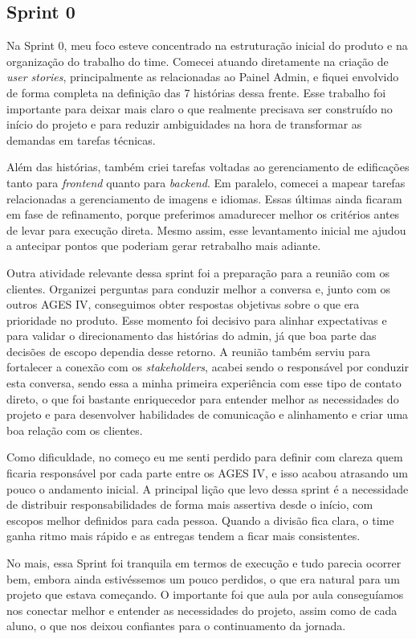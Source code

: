 \subsection{Sprint 0}

Na Sprint 0, meu foco esteve concentrado na estruturação inicial do produto e na organização do trabalho do time. Comecei atuando diretamente na criação de \textit{user stories}, principalmente as relacionadas ao Painel Admin, e fiquei envolvido de forma completa na definição das 7 histórias dessa frente. Esse trabalho foi importante para deixar mais claro o que realmente precisava ser construído no início do projeto e para reduzir ambiguidades na hora de transformar as demandas em tarefas técnicas.

Além das histórias, também criei tarefas voltadas ao gerenciamento de edificações tanto para \textit{frontend} quanto para \textit{backend}. Em paralelo, comecei a mapear tarefas relacionadas a gerenciamento de imagens e idiomas. Essas últimas ainda ficaram em fase de refinamento, porque preferimos amadurecer melhor os critérios antes de levar para execução direta. Mesmo assim, esse levantamento inicial me ajudou a antecipar pontos que poderiam gerar retrabalho mais adiante.

Outra atividade relevante dessa sprint foi a preparação para a reunião com os clientes. Organizei perguntas para conduzir melhor a conversa e, junto com os outros AGES IV, conseguimos obter respostas objetivas sobre o que era prioridade no produto. Esse momento foi decisivo para alinhar expectativas e para validar o direcionamento das histórias do admin, já que boa parte das decisões de escopo dependia desse retorno. A reunião também serviu para fortalecer a conexão com os \textit{stakeholders}, acabei sendo o responsável por conduzir esta conversa, sendo essa a minha primeira experiência com esse tipo de contato direto, o que foi bastante enriquecedor para entender melhor as necessidades do projeto e para desenvolver habilidades de comunicação e alinhamento e criar uma boa relação com os clientes.

Como dificuldade, no começo eu me senti perdido para definir com clareza quem ficaria responsável por cada parte entre os AGES IV, e isso acabou atrasando um pouco o andamento inicial. A principal lição que levo dessa sprint é a necessidade de distribuir responsabilidades de forma mais assertiva desde o início, com escopos melhor definidos para cada pessoa. Quando a divisão fica clara, o time ganha ritmo mais rápido e as entregas tendem a ficar mais consistentes.

No mais, essa Sprint foi tranquila em termos de execução e tudo parecia ocorrer bem, embora ainda estivéssemos um pouco perdidos, o que era natural para um projeto que estava começando. O importante foi que aula por aula conseguíamos nos conectar melhor e entender as necessidades do projeto, assim como de cada aluno, o que nos deixou confiantes para o continuamento da jornada.
